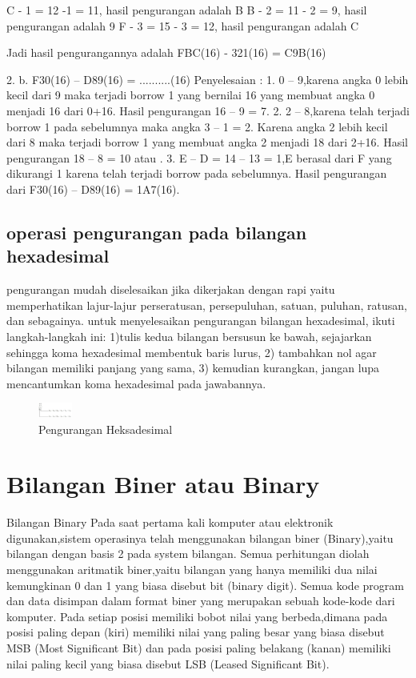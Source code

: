 C - 1 = 12 -1 = 11, hasil pengurangan adalah B 
B - 2 = 11 - 2 = 9,  hasil pengurangan adalah 9
F - 3 = 15 - 3 = 12, hasil pengurangan adalah C 

Jadi hasil pengurangannya adalah  FBC(16) - 321(16) = C9B(16) 

	2. b.	F30(16) – D89(16) =  ..........(16)
Penyelesaian :
1.	0 – 9,karena angka 0 lebih kecil dari 9 maka terjadi borrow 1 yang bernilai 16 yang membuat angka 0 menjadi 16 dari 0+16. Hasil pengurangan 16 – 9 = 7.
2.	2 – 8,karena telah terjadi borrow 1 pada sebelumnya maka angka 3 – 1 = 2. Karena angka 2 lebih kecil dari 8 maka terjadi borrow 1 yang membuat angka 2 menjadi 18 dari 2+16. Hasil pengurangan 18 – 8 = 10 atau .
3.	E – D = 14 – 13 = 1,E berasal dari F yang dikurangi 1 karena telah terjadi borrow pada sebelumnya.
Hasil pengurangan dari F30(16) – D89(16) = 1A7(16).
	
\subsection{operasi pengurangan pada bilangan hexadesimal}
pengurangan mudah diselesaikan jika dikerjakan dengan rapi yaitu memperhatikan lajur-lajur perseratusan, persepuluhan, satuan, puluhan, ratusan, dan sebagainya. untuk menyelesaikan pengurangan bilangan hexadesimal, ikuti langkah-langkah ini: 1)tulis kedua bilangan bersusun ke bawah, sejajarkan sehingga koma hexadesimal membentuk baris lurus, 2) tambahkan nol agar bilangan memiliki panjang yang sama, 3) kemudian kurangkan, jangan lupa mencantumkan koma hexadesimal pada jawabannya.

\begin{figure}[ht]
\centerline{\includegraphics[width=0.1\textwidth]{figures/heksadesimal.jpg}}
\caption{Pengurangan Heksadesimal}
\label{Bilangandesimal}
\end {figure}

\section {Bilangan Biner atau Binary}
Bilangan Binary Pada saat pertama kali komputer atau elektronik digunakan,sistem operasinya telah menggunakan bilangan biner (Binary),yaitu bilangan dengan basis 2 pada system bilangan. Semua perhitungan diolah menggunakan aritmatik biner,yaitu bilangan yang hanya memiliki dua nilai kemungkinan 0 dan 1 yang biasa disebut bit (binary digit). Semua kode program dan data disimpan dalam format biner yang merupakan sebuah kode-kode dari komputer. Pada setiap posisi memiliki bobot nilai yang berbeda,dimana pada posisi paling depan (kiri) memiliki nilai yang paling besar yang biasa disebut MSB (Most Significant Bit) dan pada posisi paling belakang (kanan) memiliki nilai paling kecil yang biasa disebut LSB (Leased Significant Bit).
	
